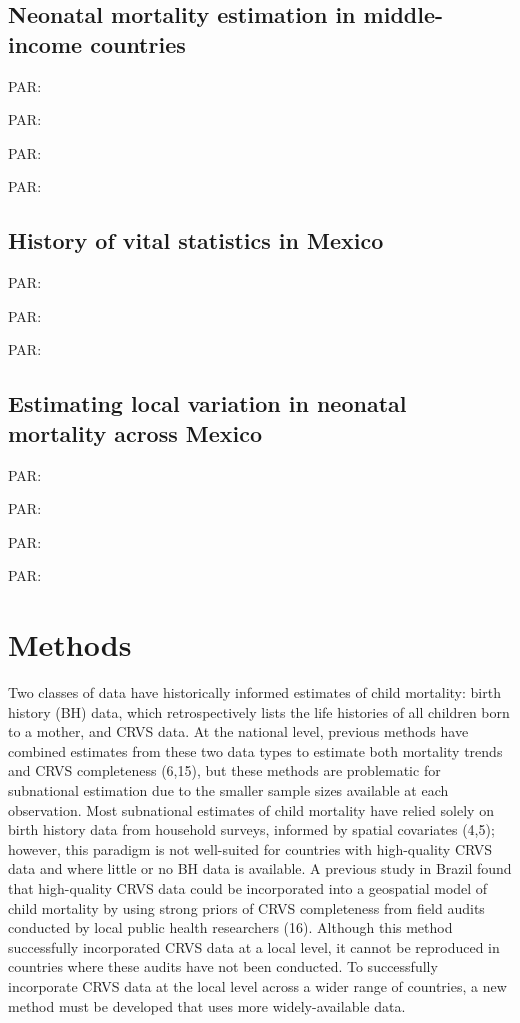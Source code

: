 \documentclass[
]{article}
\begin{document}
\hypertarget{neonatal-mortality-estimation-in-middle-income-countries}{%
\subsection{Neonatal mortality estimation in middle-income countries}\label{neonatal-mortality-estimation-in-middle-income-countries}}

PAR:

PAR:

PAR:

PAR:

\hypertarget{history-of-vital-statistics-in-mexico}{%
\subsection{History of vital statistics in Mexico}\label{history-of-vital-statistics-in-mexico}}

PAR:

PAR:

PAR:

\hypertarget{estimating-local-variation-in-neonatal-mortality-across-mexico}{%
\subsection{Estimating local variation in neonatal mortality across Mexico}\label{estimating-local-variation-in-neonatal-mortality-across-mexico}}

PAR:

PAR:

PAR:

PAR:

\hypertarget{methods}{%
\section{Methods}\label{methods}}

Two classes of data have historically informed estimates of child mortality: birth history (BH) data, which retrospectively lists the life histories of all children born to a mother, and CRVS data. At the national level, previous methods have combined estimates from these two data types to estimate both mortality trends and CRVS completeness (6,15), but these methods are problematic for subnational estimation due to the smaller sample sizes available at each observation. Most subnational estimates of child mortality have relied solely on birth history data from household surveys, informed by spatial covariates (4,5); however, this paradigm is not well-suited for countries with high-quality CRVS data and where little or no BH data is available. A previous study in Brazil found that high-quality CRVS data could be incorporated into a geospatial model of child mortality by using strong priors of CRVS completeness from field audits conducted by local public health researchers (16). Although this method successfully incorporated CRVS data at a local level, it cannot be reproduced in countries where these audits have not been conducted. To successfully incorporate CRVS data at the local level across a wider range of countries, a new method must be developed that uses more widely-available data.
\end{document}
